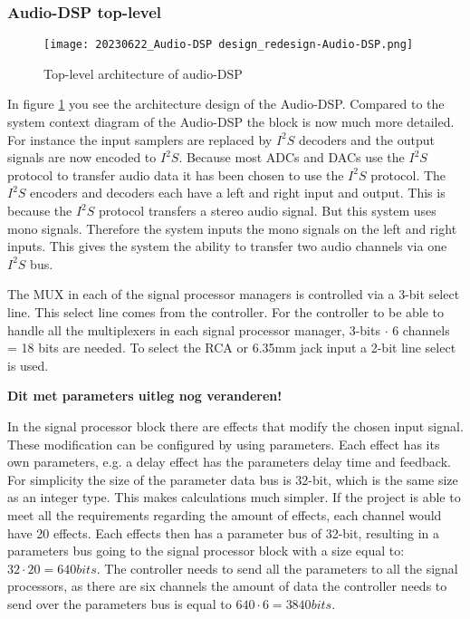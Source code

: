 \subsubsection{Audio-DSP top-level}
\begin{figure}[ht]
    \texttt{[image: 20230622\_Audio-DSP design\_redesign-Audio-DSP.png]}\\    
    \caption{Top-level architecture of audio-DSP}
    \label{fig:arch-top}
\end{figure}

In figure \ref{fig:arch-top} you see the architecture design of the Audio-DSP. Compared to the system context diagram of the Audio-DSP the block is now much more detailed. For instance the input samplers are replaced by $I^2S$ decoders and the output signals are now encoded to $I^2S$. Because most ADCs and DACs use the $I^2S$ protocol to transfer audio data it has been chosen to use the $I^2S$ protocol. The $I^2S$ encoders and decoders each have a left and right input and output. This is because the $I^2S$ protocol transfers a stereo audio signal. But this system uses mono signals. Therefore the system inputs the mono signals on the left and right inputs. This gives the system the ability to transfer two audio channels via one $I^2S$ bus.

The MUX in each of the signal processor managers is controlled via a 3-bit select line. This select line comes from the controller. For the controller to be able to handle all the multiplexers in each signal processor manager, 3-bits $\cdot$ 6 channels = 18 bits are needed. To select the RCA or 6.35mm jack input a 2-bit line select is used.

\bf{Dit met parameters uitleg nog veranderen!}

In the signal processor block there are effects that modify the chosen input signal. These modification can be configured by using parameters. Each effect has its own parameters, e.g. a delay effect has the parameters delay time and feedback. For simplicity the size of the parameter data bus is 32-bit, which is the same size as an integer type. This makes calculations much simpler. If the project is able to meet all the requirements regarding the amount of effects, each channel would have 20 effects. Each effects then has a parameter bus of 32-bit, resulting in a parameters bus going to the signal processor block with a size equal to: $32\cdot20=640 bits$. The controller needs to send all the parameters to all the signal processors, as there are six channels the amount of data the controller needs to send over the parameters bus is equal to $640\cdot6=3840 bits$. 


